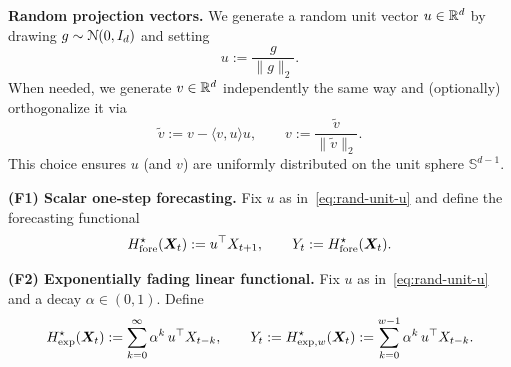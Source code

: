 \noindent\textbf{Random projection vectors.}
We generate a random unit vector $u\in\mathbb{R}^d$ by drawing $g\sim{\mathcal{N}}(0,I_d)$ and setting
\begin{equation}\label{eq:rand-unit-u}
    u := \frac{g}{\|g\|_2}.
\end{equation}
When needed, we generate $v\in\mathbb{R}^d$ independently the same way and (optionally) orthogonalize it via
\begin{equation}\label{eq:rand-unit-v}
    \tilde v := v - \langle v,u\rangle u,\qquad v := \frac{\tilde v}{\|\tilde v\|_2}.
\end{equation}
This choice ensures $u$ (and $v$) are uniformly distributed on the unit sphere $\mathbb{S}^{d-1}$.


\noindent\textbf{(F1) Scalar one-step forecasting.}
Fix $u$ as in~\cref{eq:rand-unit-u} and define the forecasting functional
\begin{equation}\label{eq:F1}
    H^\star_{\rm fore}(\boldsymbol{X}_t) := u^\top X_{t+1},
    \qquad Y_t := H^\star_{\rm fore}(\boldsymbol{X}_t).
\end{equation}

\noindent\textbf{(F2) Exponentially fading linear functional.}
Fix $u$ as in~\cref{eq:rand-unit-u} and a decay $\alpha\in(0,1)$. Define
\begin{equation}\label{eq:F2}
    H^\star_{\rm exp}(\boldsymbol{X}_t)
    := \sum_{k=0}^{\infty}\alpha^k\, u^\top X_{t-k},
    \qquad
    Y_t := H^\star_{{\rm exp},w}(\boldsymbol{X}_t)
    := \sum_{k=0}^{w-1}\alpha^k\, u^\top X_{t-k}.
\end{equation}


